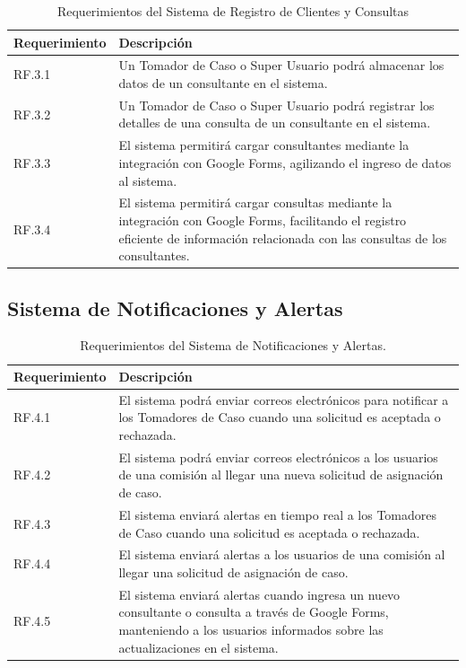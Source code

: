 \begin{table}[H]
    \centering
    \begin{tabular}{|l|p{10cm}|}
        \hline
        \textbf{Requerimiento} & \textbf{Descripción} \\
        \hline
        RF.3.1 & Un Tomador de Caso o Super Usuario podrá almacenar los datos de un consultante en el sistema. \\
        \hline
        RF.3.2 & Un Tomador de Caso o Super Usuario podrá registrar los detalles de una consulta de un consultante en el sistema. \\
        \hline
        RF.3.3 & El sistema permitirá cargar consultantes mediante la integración con Google Forms, agilizando el ingreso de datos al sistema. \\
        \hline
        RF.3.4 & El sistema permitirá cargar consultas mediante la integración con Google Forms, facilitando el registro eficiente de información relacionada con las consultas de los consultantes. \\
        \hline
    \end{tabular}
    \caption{Requerimientos del Sistema de Registro de Clientes y Consultas}
    \label{tab:registro-consultantes-consultas}
\end{table}


\subsection{Sistema de Notificaciones y Alertas}

\begin{table}[H]
    \centering
    \begin{tabular}{|l|p{10cm}|}
        \hline
        \textbf{Requerimiento} & \textbf{Descripción} \\
        \hline
        RF.4.1 & El sistema podrá enviar correos electrónicos para notificar a los Tomadores de Caso cuando una solicitud es aceptada o rechazada. \\
        \hline
        RF.4.2 & El sistema podrá enviar correos electrónicos a los usuarios de una comisión al llegar una nueva solicitud de asignación de caso. \\
        \hline
        RF.4.3 & El sistema enviará alertas en tiempo real a los Tomadores de Caso cuando una solicitud es aceptada o rechazada. \\
        \hline
        RF.4.4 & El sistema enviará alertas a los usuarios de una comisión al llegar una solicitud de asignación de caso. \\
        \hline
        RF.4.5 & El sistema enviará alertas cuando ingresa un nuevo consultante o consulta a través de Google Forms, manteniendo a los usuarios informados sobre las actualizaciones en el sistema. \\
        \hline
    \end{tabular}
    \caption{Requerimientos del Sistema de Notificaciones y Alertas.}
    \label{tab:notificaciones-alertas}
\end{table}

